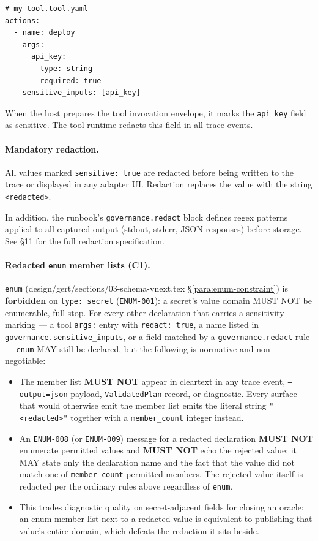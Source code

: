 \begin{verbatim}
# my-tool.tool.yaml
actions:
  - name: deploy
    args:
      api_key:
        type: string
        required: true
    sensitive_inputs: [api_key]
\end{verbatim}

When the host prepares the tool invocation envelope, it marks the
\texttt{api\_key} field as sensitive.  The tool runtime redacts this field in
all trace events.

\paragraph{Mandatory redaction.}
All values marked \texttt{sensitive: true} are redacted before being written to
the trace or displayed in any adapter UI.  Redaction replaces the value with
the string \texttt{<redacted>}.

In addition, the runbook's \texttt{governance.redact} block defines regex
patterns applied to all captured output (stdout, stderr, JSON responses) before
storage.  See §11 for the full redaction specification.

\paragraph{Redacted \texttt{enum} member lists (C1).}
\texttt{enum} (design/gert/sections/03-schema-vnext.tex \S\ref{para:enum-constraint})
is \textbf{forbidden} on \texttt{type: secret} (\texttt{ENUM-001}): a secret's
value domain MUST NOT be enumerable, full stop. For every other declaration
that carries a sensitivity marking --- a tool \texttt{args:} entry with
\texttt{redact: true}, a name listed in \texttt{governance.sensitive\_inputs},
or a field matched by a \texttt{governance.redact} rule --- \texttt{enum} MAY
still be declared, but the following is normative and non-negotiable:

\begin{itemize}
  \item The member list \textbf{MUST NOT} appear in cleartext in any trace
        event, \texttt{--output=json} payload, \texttt{ValidatedPlan}
        record, or diagnostic. Every surface that would otherwise emit the
        member list emits the literal string \texttt{"<redacted>"} together
        with a \texttt{member\_count} integer instead.
  \item An \texttt{ENUM-008} (or \texttt{ENUM-009}) message for a redacted
        declaration \textbf{MUST NOT} enumerate permitted values and
        \textbf{MUST NOT} echo the rejected value; it MAY state only the
        declaration name and the fact that the value did not match one of
        \texttt{member\_count} permitted members. The rejected value itself
        is redacted per the ordinary rules above regardless of \texttt{enum}.
  \item This trades diagnostic quality on secret-adjacent fields for
        closing an oracle: an enum member list next to a redacted value is
        equivalent to publishing that value's entire domain, which defeats
        the redaction it sits beside.
\end{itemize}

